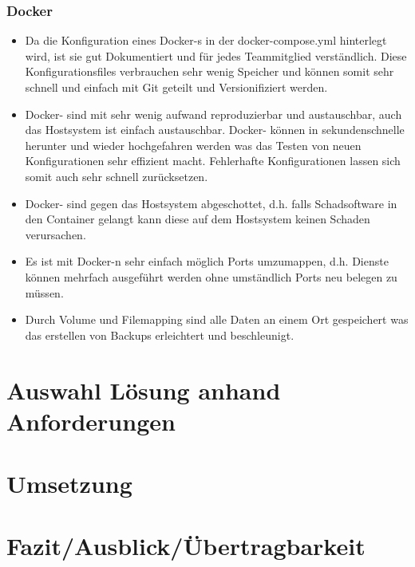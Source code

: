 \documentclass[a4paper,11pt,singlespacing]{article}
\begin{document}
		\subsubsection{Docker}\label{Docker}
			\begin{itemize}
			\item
				Da die Konfiguration eines  Docker-s in der docker-compose.yml hinterlegt wird, ist sie gut Dokumentiert und für jedes Teammitglied verständlich.
				Diese Konfigurationsfiles verbrauchen sehr wenig Speicher und können somit sehr schnell und einfach mit Git geteilt und Versionifiziert werden.
			\item
				Docker- sind mit sehr wenig aufwand reproduzierbar und austauschbar, auch das Hostsystem ist einfach austauschbar.
				Docker- können in sekundenschnelle herunter und wieder hochgefahren werden was das Testen von neuen Konfigurationen sehr effizient macht.
				Fehlerhafte Konfigurationen lassen sich somit auch sehr schnell zurücksetzen.
			\item
				Docker- sind gegen das Hostsystem abgeschottet, d.h. falls Schadsoftware in den Container gelangt kann diese auf dem Hostsystem keinen Schaden verursachen.
			\item
				Es ist mit Docker-n sehr einfach möglich Ports umzumappen, d.h. Dienste können mehrfach ausgeführt werden ohne umständlich Ports neu belegen zu müssen.
			\item
				Durch Volume und Filemapping sind alle Daten an einem Ort gespeichert was das erstellen von Backups erleichtert und beschleunigt.
			\end{itemize}

\section{Auswahl Lösung anhand Anforderungen}\label{sec:AuswahlLösungAnhandAnforderungen}
%
%
\section{Umsetzung}\label{sec:Umsetzung}
%
%
\section{Fazit/Ausblick/Übertragbarkeit}\label{sec:Fazit/Ausblick/Übertragbarkeit}
\end{document}

